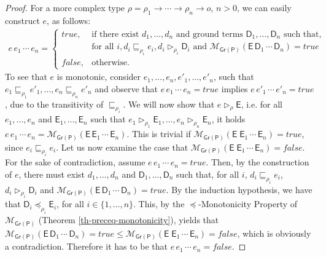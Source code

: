 \documentclass[submission,copyright]{eptcs}
\theoremstyle{definition}
\newcommand{\aleq}[1][]{\sqsubseteq_{#1}}
\newcommand{\ee}[1][I]{\rhd_{#1}}
\newcommand{\bezem}{\mathcal{M}_\mathsf{Gr(P)}}
\begin{document}
\begin{proof}
For a more complex type $\rho = \rho_1 \rightarrow \cdots \rightarrow \rho_n \rightarrow o$, $n > 0$,
we can easily construct $e$, as follows:
\begin{align*}
e \,e_1\,\cdots\,e_n =
  \begin{cases}
      \mathit{true},  & \mbox{if there exist } d_1, \ldots, d_n \mbox{ and ground terms } \mathsf{D}_1,\ldots,\mathsf{D}_n  \mbox{ such that,}\\
             &  \mbox{for all } i, d_i  \aleq[\rho_i] e_i, d_i \ee[\rho_i] \mathsf{D}_i \mbox{ and } \bezem(\mathsf{E}\, \mathsf{D}_1 \, \cdots \, \mathsf{D}_n)=\mathit{true} \\
      \mathit{false}, & \mbox{otherwise.}
  \end{cases}
\end{align*}
To see that $e$ is monotonic, consider $e_1, \ldots, e_n, e'_1, \ldots, e'_n$,
such that $e_1 \aleq[\rho_1] e'_1, \ldots, e_n \aleq[\rho_n] e'_n$ and observe
that $e \,e_1\,\cdots\,e_n = true$ implies $e \,e'_1\,\cdots\,e'_n=true$, due to
the transitivity of $\aleq[\rho_i]$.
We will now show that $e \ee[\rho] \mathsf{E}$, i.e. for all $e_1, \ldots, e_n$ and
$\mathsf{E}_1, \ldots, \mathsf{E}_n$ such that $e_1 \ee[\rho_1] \mathsf{E}_1, \ldots, e_n \ee[\rho_n] \mathsf{E}_n$, it
holds $e \,e_1\,\cdots\,e_n = \bezem(\mathsf{E} \, \mathsf{E}_1 \, \cdots \, \mathsf{E}_n)$. This is trivial
if $\bezem(\mathsf{E} \; \mathsf{E}_1 \, \cdots \, \mathsf{E}_n) = true$, since $e_i \aleq[\rho_i] e_i$. Let
us now examine the case that $\bezem(\mathsf{E} \; \mathsf{E}_1 \, \cdots \, \mathsf{E}_n) = \mathit{false}$. For the
sake of contradiction, assume $e \,e_1\,\cdots\,e_n= true$. Then,
by the construction of $e$, there must exist $d_1, \ldots, d_n$ and $\mathsf{D}_1,\ldots,\mathsf{D}_n$
such that, for all $i$, $d_i  \aleq[\rho_i] e_i$, $d_i \ee[\rho_i] \mathsf{D}_i$ and $\bezem(\mathsf{E}\, \mathsf{D}_1 \, \cdots \, \mathsf{D}_n)=true$. By the induction hypothesis, we have that $\mathsf{D}_i \preceq_{\rho_i} \mathsf{E}_i$, for all $i \in \{1, \ldots, n\}$. This, by the $\preceq$-Monotonicity Property of $\bezem$ (Theorem \ref{th-preceq-monotonicity}), yields that $\bezem(\mathsf{E}\, \mathsf{D}_1 \, \cdots \, \mathsf{D}_n)=true \leq \bezem(\mathsf{E} \; \mathsf{E}_1 \, \cdots \, \mathsf{E}_n) = \mathit{false}$, which is obviously a contradiction. Therefore it has to be that $e \,e_1\,\cdots\,e_n= \mathit{false}$.


\end{proof}
\end{document}
